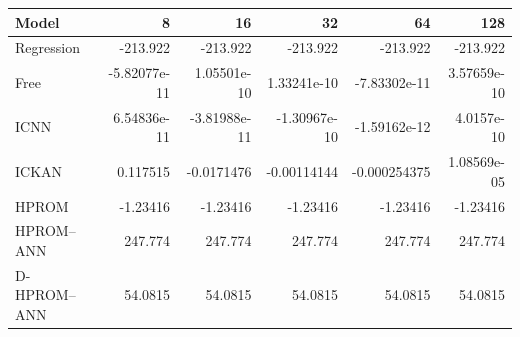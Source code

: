 \begin{tabular}{lrrrrr}
\toprule
Model & 8 & 16 & 32 & 64 & 128 \\
\midrule
Regression & -213.922 & -213.922 & -213.922 & -213.922 & -213.922 \\
Free & -5.82077e-11 & 1.05501e-10 & 1.33241e-10 & -7.83302e-11 & 3.57659e-10 \\
ICNN & 6.54836e-11 & -3.81988e-11 & -1.30967e-10 & -1.59162e-12 & 4.0157e-10 \\
ICKAN & 0.117515 & -0.0171476 & -0.00114144 & -0.000254375 & 1.08569e-05 \\
HPROM & -1.23416 & -1.23416 & -1.23416 & -1.23416 & -1.23416 \\
HPROM--ANN & 247.774 & 247.774 & 247.774 & 247.774 & 247.774 \\
D-HPROM--ANN & 54.0815 & 54.0815 & 54.0815 & 54.0815 & 54.0815 \\
\bottomrule
\end{tabular}

\par{}
